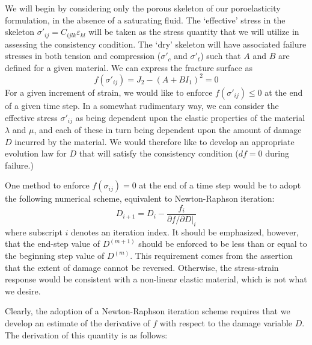 \documentclass[11pt]{article} %
\begin{document}
We will begin by considering only the porous skeleton of our poroelasticity formulation, in the absence of a saturating fluid. The `effective' stress in the skeleton $\sigma'_{ij} = C_{ijlk} \varepsilon_{kl}$ will be taken as the stress quantity that we will utilize in assessing the consistency condition. The `dry' skeleton will have associated failure stresses in both tension and compression ($\sigma'_c$ and $\sigma'_t$) such that $A$ and $B$ are defined for a given material. We can express the fracture surface as
\begin{equation}
	f(\sigma'_{ij}) = J_2 - (A + B I_1)^2 = 0
\end{equation}
For a given increment of strain, we would like to enforce $f(\sigma'_{ij}) \leq 0$ at the end of a given time step. In a somewhat rudimentary way, we can consider the effective stress $\sigma'_{ij}$ as being dependent upon the elastic properties of the material $\lambda$ and $\mu$, and each of these in turn being dependent upon the amount of damage $D$ incurred by the material. We would therefore like to develop an appropriate evolution law for $D$ that will satisfy the consistency condition ($df = 0$ during failure.)

One method to enforce $f(\sigma_{ij}) = 0$ at the end of a time step would be to adopt the following numerical scheme, equivalent to Newton-Raphson iteration:
\begin{equation}
	D_{i+1} = D_{i} - \frac{f_{i}}{\partial f/ \partial D |_{i}}
	\label{eq:newtonraphson}
\end{equation}
where subscript $i$ denotes an iteration index. It should be emphasized, however, that the end-step value of $D^{(m+1)}$ should be enforced to be less than or equal to the beginning step value of $D^{(m)}$. This requirement comes from the assertion that the extent of damage cannot be reversed. Otherwise, the stress-strain response would be consistent with a non-linear elastic material, which is not what we desire.

Clearly, the adoption of a Newton-Raphson iteration scheme requires that we develop an estimate of the derivative of $f$ with respect to the damage variable $D$. The derivation of this quantity is as follows:
\end{document}

